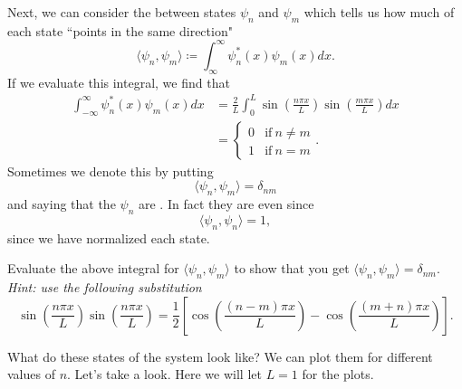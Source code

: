 Next, we can consider the  between states $\psi_n$ and $\psi_m$ which tells us how much of each state ``points in the same direction"
\[
\langle \psi_n,\psi_m \rangle \coloneqq \int_{\infty}^\infty \psi_n^*(x) \psi_m(x) dx.
\]
If we evaluate this integral, we find that
\begin{align*}
    \int_{-\infty}^\infty \psi_n^*(x)\psi_m(x)dx&= \frac{2}{L}\int_0^L \sin\left( \frac{n\pi x}{L}\right)\sin\left( \frac{m\pi x}{L}\right)dx\\
    &= \begin{cases} 0 &\textrm{if}~ n\neq m\\
    1 & \textrm{if}~ n=m\end{cases}.
\end{align*}
Sometimes we denote this by putting
\[
\langle \psi_n,\psi_m\rangle = \delta_{nm}
\]
and saying that the $\psi_n$ are . In fact they are even  since
\[
\langle \psi_n,\psi_n\rangle = 1,
\]
since we have normalized each state.
\begin{exercise}
Evaluate the above integral for $\langle \psi_n, \psi_m \rangle$ to show that you get $\langle \psi_n,\psi_m\rangle = \delta_{nm}$.  \emph{Hint: use the following substitution} 
\[
\sin\left(\frac{n\pi x}{L}\right)\sin\left(\frac{n\pi x}{L}\right) =\frac{1}{2}\left[ \cos\left( \frac{(n-m)\pi x}{L} \right) - \cos\left( \frac{(m+n)\pi x}{L}\right)\right].
\]
\end{exercise}
What do these states of the system look like? We can plot them for different values of $n$. Let's take a look. Here we will let $L=1$ for the plots.
